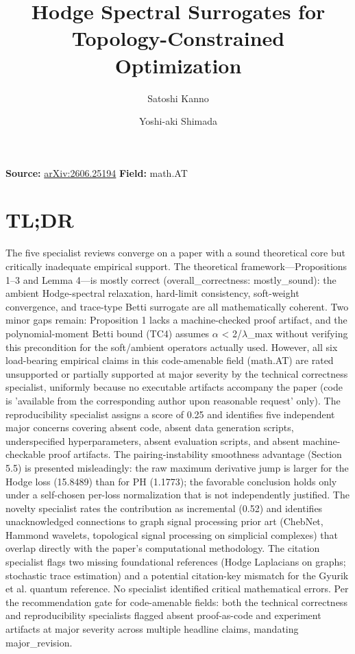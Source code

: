 \documentclass[11pt]{article}
\title{Hodge Spectral Surrogates for Topology-Constrained Optimization}
\author{Satoshi Kanno \and Yoshi-aki Shimada}
\date{}
\begin{document}
\maketitle

\noindent\textbf{Source:} \href{https://arxiv.org/abs/2606.25194}{arXiv:2606.25194} \quad \textbf{Field:} math.AT\\

\section*{TL;DR}
The five specialist reviews converge on a paper with a sound theoretical core but critically inadequate empirical support. The theoretical framework---Propositions 1--3 and Lemma 4---is mostly correct (overall\_correctness: mostly\_sound): the ambient Hodge-spectral relaxation, hard-limit consistency, soft-weight convergence, and trace-type Betti surrogate are all mathematically coherent. Two minor gaps remain: Proposition 1 lacks a machine-checked proof artifact, and the polynomial-moment Betti bound (TC4) assumes \ensuremath{\alpha} < 2/\ensuremath{\lambda}\_max without verifying this precondition for the soft/ambient operators actually used. However, all six load-bearing empirical claims in this code-amenable field (math.AT) are rated unsupported or partially supported at major severity by the technical correctness specialist, uniformly because no executable artifacts accompany the paper (code is 'available from the corresponding author upon reasonable request' only). The reproducibility specialist assigns a score of 0.25 and identifies five independent major concerns covering absent code, absent data generation scripts, underspecified hyperparameters, absent evaluation scripts, and absent machine-checkable proof artifacts. The pairing-instability smoothness advantage (Section 5.5) is presented misleadingly: the raw maximum derivative jump is larger for the Hodge loss (15.8489) than for PH (1.1773); the favorable conclusion holds only under a self-chosen per-loss normalization that is not independently justified. The novelty specialist rates the contribution as incremental (0.52) and identifies unacknowledged connections to graph signal processing prior art (ChebNet, Hammond wavelets, topological signal processing on simplicial complexes) that overlap directly with the paper's computational methodology. The citation specialist flags two missing foundational references (Hodge Laplacians on graphs; stochastic trace estimation) and a potential citation-key mismatch for the Gyurik et al. quantum reference. No specialist identified critical mathematical errors. Per the recommendation gate for code-amenable fields: both the technical correctness and reproducibility specialists flagged absent proof-as-code and experiment artifacts at major severity across multiple headline claims, mandating major\_revision.
\end{document}
